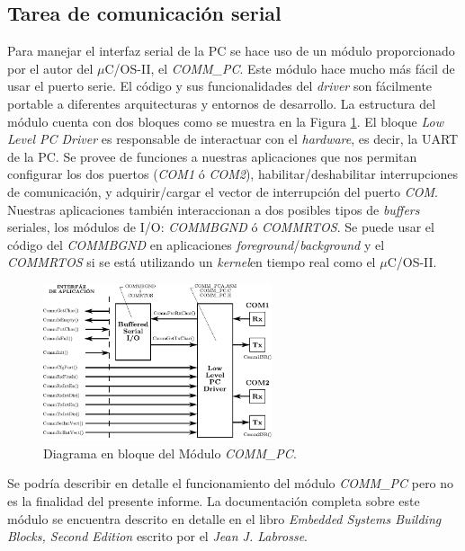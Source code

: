 \documentclass[11pt,a4paper,oneside]{article}
\def\uCOS{$\mu$C/OS-II\texttrademark}
\begin{document}
\subsection{Tarea de comunicación serial}
\label{sec:mod-com}

Para manejar el interfaz serial de la PC se hace uso de un módulo proporcionado por el autor del \uCOS, el \emph{COMM\_PC}. Este módulo hace mucho más fácil de usar el puerto serie. El código y sus funcionalidades del \textsl{driver} son fácilmente portable a diferentes arquitecturas y entornos de desarrollo. La estructura del módulo cuenta con dos bloques como se muestra en la Figura \ref{fig:comm-pc}. El bloque \textsl{Low Level PC Driver} es responsable de interactuar con el \textsl{hardware}, es decir, la UART de la PC. Se provee de funciones a nuestras aplicaciones que nos permitan configurar los dos puertos (\emph{COM1} ó \emph{COM2}), habilitar/deshabilitar interrupciones de comunicación, y adquirir/cargar el vector de interrupción del puerto \emph{COM}.
Nuestras aplicaciones también interaccionan a dos posibles tipos de \textsl{buffers} seriales, los módulos de I/O: \emph{COMMBGND} ó \emph{COMMRTOS}. Se puede usar el código del \emph{COMMBGND} en aplicaciones \textsl{foreground}/\textsl{background} y el \emph{COMMRTOS} si se está utilizando un \textsl{kernel}en tiempo real como el \uCOS.

\begin{figure}[h]
  \centering
  \includegraphics[width=0.6\textwidth]{images/modulo_comm_pc}
  \caption{Diagrama en bloque del Módulo \emph{COMM\_PC}.}
  \label{fig:comm-pc}
\end{figure}

Se podría describir en detalle el funcionamiento del módulo \emph{COMM\_PC} pero no es la finalidad del presente informe. La documentación completa sobre este módulo se encuentra descrito en detalle en el libro \emph{Embedded Systems Building Blocks, Second Edition} escrito por el \emph{Jean  J. Labrosse}.
\end{document}
